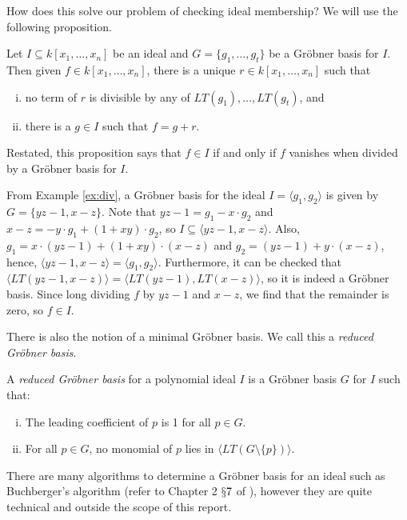 \documentclass[../main.tex]{subfiles}
\begin{document}
    How does this solve our problem of checking ideal membership? We will use the following proposition.
    \begin{proposition}
        Let $I\subseteq k[x_1,\dots,x_n]$ be an ideal and $G=\{g_1,\dots,g_t\}$ be a Gr\"obner basis for $I$. Then given $f\in k[x_1,\dots,x_n]$, there is a unique $r\in k[x_1,\dots,x_n]$ such that 
        \begin{enumerate}[(i)]
            \item no term of $r$ is divisible by any of $LT(g_1),\dots,LT(g_t)$, and
            \item there is a $g\in I$ such that $f=g+r$.
        \end{enumerate}
    \end{proposition}
    Restated, this proposition says that $f\in I$ if and only if $f$ vanishes when divided by a Gr\"obner basis for $I$.

    \begin{example}
        From Example \ref{ex:div}, a Gr\"obner basis for the ideal $I=\langle g_1,g_2\rangle$ is given by $G=\{yz-1,x-z\}$. Note that $yz-1=g_1-x\cdot g_2$ and $x-z=-y\cdot g_1+(1+xy)\cdot g_2$, so $I\subseteq \langle yz-1,x-z\rangle$. Also, $g_1 = x\cdot(yz-1)+(1+xy)\cdot(x-z)$ and $g_2=(yz-1)+y\cdot(x-z)$, hence, $\langle yz-1,x-z\rangle = \langle g_1,g_2\rangle$. Furthermore, it can be checked that $\langle LT(yz-1,x-z)\rangle = \langle LT(yz-1), LT(x-z)\rangle$, so it is indeed a Gr\"obner basis. Since long dividing $f$ by $yz-1$ and $x-z$, we find that the remainder is zero, so $f\in I$.
    \end{example}

%

    There is also the notion of a minimal Gr\"obner basis. We call this a \emph{reduced Gr\"obner basis}.

    \begin{definition}
        A \emph{reduced Gr\"obner basis} for a polynomial ideal $I$ is a Gr\"obner basis $G$ for $I$ such that:
        \begin{enumerate}[(i)]
            \item The leading coefficient of $p$ is 1 for all $p\in G$.
            \item For all $p\in G$, no monomial of $p$ lies in $\langle LT(G\setminus\{p\})\rangle$.
        \end{enumerate}
    \end{definition}

    There are many algorithms to determine a Gr\"obner basis for an ideal such as Buchberger's algorithm (refer to Chapter 2 $\mathsection 7$ of \cite{cox2013ideals}), however they are quite technical and outside the scope of this report.
\end{document}
